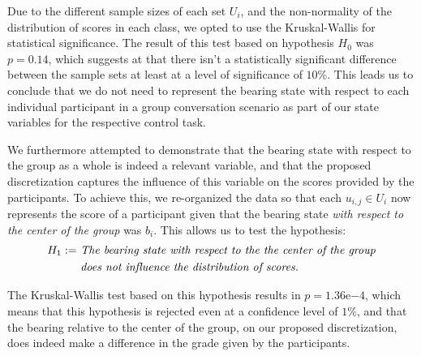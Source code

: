 \documentclass[a4paper,11pt]{report}
\begin{document}
Due to the different sample sizes of each set $U_i$, and the non-normality of the distribution of scores in each class, we opted to use the Kruskal-Wallis for statistical significance. The result of this test based on hypothesis $H_0$ was $p = 0.14$, which suggests at that there isn't a statistically significant difference between the sample sets at least at a level of significance of $10\%$. This leads us to conclude that we do not need to represent the bearing state with respect to each individual participant in a group conversation scenario as part of our state variables for the respective control task.

We furthermore attempted to demonstrate that the bearing state with respect to the group as a whole is indeed a relevant variable, and that the proposed discretization captures the influence of this variable on the scores provided by the participants. To achieve this, we re-organized the data so that each $u_{i,j}\in U_i$ now represents the score of a participant given that the bearing state \emph{with respect to the center of the group} was $b_i$. This allows us to test the hypothesis:
\begin{align*}
 H_1 := & \text{ \textit{The bearing state with respect to the the center of the group}}\\
        & \text{ \textit{does not influence the distribution of scores.}}
\end{align*}

The Kruskal-Wallis test based on this hypothesis results in $p = 1.36\mathrm{e}{-4}$, which means that this hypothesis is rejected even at a confidence level of $1\%$, and that the bearing relative to the center of the group, on our proposed discretization, does indeed make a difference in the grade given by the participants.
\end{document}
